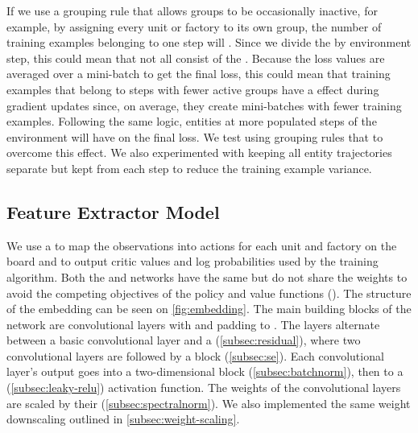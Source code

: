 \noindent If we use a grouping rule that allows groups to be occasionally inactive, for example, by assigning every unit or factory to its own group, the number of training examples belonging to one step will . Since we divide the  by environment step, this could mean that not all  consist of the . Because the loss values are averaged over a mini-batch to get the final loss, this could mean that training examples that belong to steps with fewer active groups have a  effect during gradient updates since, on average, they create mini-batches with fewer training examples. Following the same logic, entities at more populated steps of the environment will have  on the final loss. We test using grouping rules that  to overcome this effect. We also experimented with keeping all entity trajectories separate but kept  from each step to reduce the training example variance.


\subsection{Feature Extractor Model}
\label{sec:hybrid-network-architecture}

\noindent We use a  to map the observations into actions for each unit and factory on the board and to output critic values and log probabilities used by the training algorithm. Both the  and  networks have the same  but do not share the weights to avoid the competing objectives of the policy and value functions (\cite{shengyi2022the37implementation}). The structure of the embedding can be seen on \autoref{fig:embedding}. The main building blocks of the network are convolutional layers with  and padding to . The layers alternate between a basic convolutional layer and a  (\autoref{subsec:residual}), where two convolutional layers are followed by a  block (\autoref{subsec:se}). Each convolutional layer's output goes into a two-dimensional  block (\autoref{subsec:batchnorm}), then to a  (\autoref{subsec:leaky-relu}) activation function. The weights of the convolutional layers are scaled by their  (\autoref{subsec:spectralnorm}). We also implemented the same weight downscaling outlined in \autoref{subsec:weight-scaling}.

